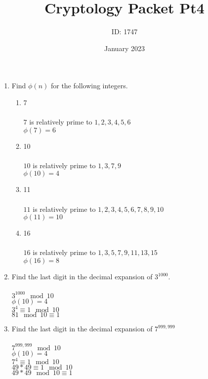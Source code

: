 \documentclass[]{article}
\date{January 2023}
\author{ID: 1747}
\title{Cryptology Packet Pt4}
\begin{document}
\maketitle

\begin{enumerate}
    \item Find $\phi(n)$ for the following integers.
    \begin{enumerate}
        \item 7
        \\\\$7$ is relatively prime to $1,2,3,4,5,6$
        \\$\phi(7)=6$
        
        \item 10
        \\\\$10$ is relatively prime to $1,3,7,9$
        \\$\phi(10)=4$

        \item 11
        \\\\$11$ is relatively prime to $1,2,3,4,5,6,7,8,9,10$
        \\$\phi(11)=10$

        \item 16
        \\\\$16$ is relatively prime to $1,3,5,7,9,11,13,15$
        \\$\phi(16)=8$
        
    \end{enumerate}

    \item Find the last digit in the decimal expansion of $3^{1000}$.
    \\\\$3^{1000} \mod 10$
    \\$\phi(10)=4$
    \\$3^{4} \equiv 1 \mod 10$
    \\$81 \mod 10 \equiv 1$

    \item Find the last digit in the decimal expansion of $7^{999,999}$
    \\\\$7^{999,999} \mod 10$
    \\$\phi(10)=4$
    \\$7^{4} \equiv 1 \mod 10$
    \\$49*49 \equiv 1 \mod 10$
    \\$49*49 \mod 10 \equiv 1$


\end{enumerate}
\end{document}
